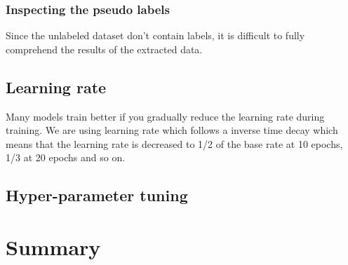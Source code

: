\documentclass[thesis.tex]{subfiles}
\begin{document}
\subsubsection{Inspecting the pseudo labels}
Since the unlabeled dataset don't contain labels, it is difficult to fully comprehend the results of the extracted data.



\subsection{Learning rate}
Many models train better if you gradually reduce the learning rate during training. We are using learning rate which follows a inverse time decay which means that the learning rate is decreased to 1/2 of the base rate at 10 epochs, 1/3 at 20 epochs and so on.



\subsection{Hyper-parameter tuning}





\section{Summary} \label{sec:C3-summary}
\end{document}

